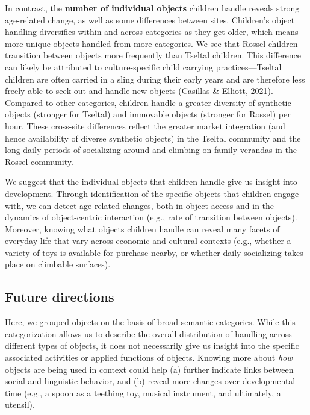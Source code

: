\documentclass[10pt, letterpaper]{article}
\begin{document}
In contrast, the \textbf{number of individual objects} children handle
reveals strong age-related change, as well as some differences between
sites. Children's object handling diversifies within and across
categories as they get older, which means more unique objects handled
from more categories. We see that Rossel children transition between
objects more frequently than Tseltal children. This difference can
likely be attributed to culture-specific child carrying
practices---Tseltal children are often carried in a sling during their
early years and are therefore less freely able to seek out and handle
new objects (Casillas \& Elliott, 2021). Compared to other categories,
children handle a greater diversity of synthetic objects (stronger for
Tseltal) and immovable objects (stronger for Rossel) per hour. These
cross-site differences reflect the greater market integration (and hence
availability of diverse synthetic objects) in the Tseltal community and
the long daily periods of socializing around and climbing on family
verandas in the Rossel community.

We suggest that the individual objects that children handle give us
insight into development. Through identification of the specific objects
that children engage with, we can detect age-related changes, both in
object access and in the dynamics of object-centric interaction (e.g.,
rate of transition between objects). Moreover, knowing what objects
children handle can reveal many facets of everyday life that vary across
economic and cultural contexts (e.g., whether a variety of toys is
available for purchase nearby, or whether daily socializing takes place
on climbable surfaces).

\hypertarget{future-directions}{%
\subsection{Future directions}\label{future-directions}}

Here, we grouped objects on the basis of broad semantic categories.
While this categorization allows us to describe the overall distribution
of handling across different types of objects, it does not necessarily
give us insight into the specific associated activities or applied
functions of objects. Knowing more about \emph{how} objects are being
used in context could help (a) further indicate links between social and
linguistic behavior, and (b) reveal more changes over developmental time
(e.g., a spoon as a teething toy, musical instrument, and ultimately, a
utensil).
\end{document}
